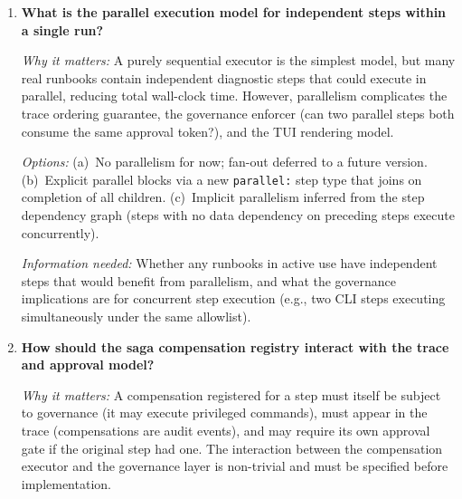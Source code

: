 \begin{enumerate}[label=\textbf{Q\arabic*.}]
    \textit{Options:} (a)~Retain JSON-RPC stdio as the sole transport; gRPC deferred to a
    future version. (b)~Add gRPC as an opt-in alternative transport alongside JSON-RPC stdio.
    (c)~Replace JSON-RPC stdio with gRPC as the primary VS~Code transport; provide a backward-compat
    shim for the transition period.

    \textit{Information needed:} Benchmarking of event delivery latency over JSON-RPC stdio versus
    gRPC under realistic VS~Code workloads (step execution at 100ms/step, TUI refresh at 60fps
    equivalent). Also requires a determination of whether VS~Code's Node.js extension host supports
    gRPC client libraries without native module issues.

  \item \textbf{What is the parallel execution model for independent steps within a single run?}

    \textit{Why it matters:} A purely sequential executor is the simplest model, but many real runbooks contain
    independent diagnostic steps that could execute in parallel, reducing total wall-clock time.
    However, parallelism complicates the trace ordering guarantee, the governance enforcer (can two
    parallel steps both consume the same approval token?), and the TUI rendering model.

    \textit{Options:} (a)~No parallelism for now; fan-out deferred to a future version. (b)~Explicit
    parallel blocks via a new \texttt{parallel:} step type that joins on completion of all children.
    (c)~Implicit parallelism inferred from the step dependency graph (steps with no data dependency
    on preceding steps execute concurrently).

    \textit{Information needed:} Whether any runbooks in active use have independent steps that
    would benefit from parallelism, and what the governance implications are for concurrent step
    execution (e.g., two CLI steps executing simultaneously under the same allowlist).

  \item \textbf{How should the saga compensation registry interact with the trace and approval model?}

    \textit{Why it matters:} A compensation registered for a step must itself be subject to
    governance (it may execute privileged commands), must appear in the trace (compensations are
    audit events), and may require its own approval gate if the original step had one. The
    interaction between the compensation executor and the governance layer is non-trivial and must
    be specified before implementation.


\end{enumerate}
